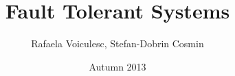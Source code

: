 \documentclass[11pt]{article} %
\title{Fault Tolerant Systems}
\author{Rafaela Voiculesc, Stefan-Dobrin Cosmin}
\date{Autumn 2013}
\begin{document}
\maketitle \newpage
\tableofcontents \newpage 






 

\nocite{*}

\end{document}

